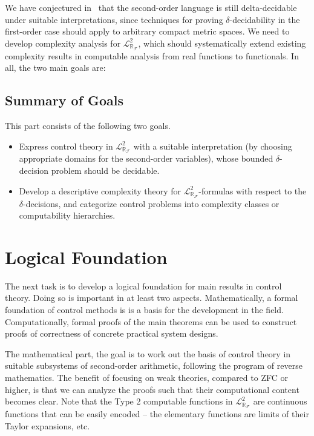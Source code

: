 \documentclass[10pt]{article}
\newcommand{\lrf}{\mathcal{L}_{\mathbb{R}_{\mathcal{F}}}}
\theoremstyle{definition}
\begin{document}
We have conjectured in~\cite{DBLP:conf/lics/GaoAC12} that the second-order language is still delta-decidable under suitable interpretations, since techniques for proving $\delta$-decidability in the first-order case should apply to arbitrary compact metric spaces. We need to develop complexity analysis for $\lrf^2$, which should systematically extend existing complexity results in computable analysis from real functions to functionals. In all, the two main goals are:

\subsection{Summary of Goals} 

This part consists of the following two goals. 
\begin{itemize}
\item Express control theory in $\mathcal{L}^2_{\mathbb{R}_{\mathcal{F}}}$ with a suitable interpretation (by choosing appropriate domains for the second-order variables), whose bounded $\delta$-decision problem should be decidable.
\item Develop a descriptive complexity theory for $\lrf^2$-formulas with respect to the $\delta$-decisions, and categorize control problems into complexity classes or computability hierarchies.
\end{itemize}

\newpage
\section{Logical Foundation}

The next task is to develop a logical foundation for main results in control theory. Doing so is important in at least two aspects. Mathematically, a formal foundation of control methods is is a basis for the development in the field. Computationally, formal proofs of the main theorems can be used to construct proofs of correctness of concrete practical system designs. 

The mathematical part, the goal is to work out the basis of control theory in suitable subsystems of second-order arithmetic, following the program of reverse mathematics. The benefit of focusing on weak theories, compared to ZFC or higher, is that we can analyze the proofs such that their computational content becomes clear. Note that the Type 2 computable functions in  $\lrf^2$ are continuous functions that can be easily encoded -- the elementary functions are limits of their Taylor expansions, etc. 
\end{document}

